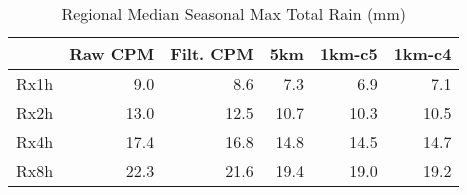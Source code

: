 \begin{table}
\caption{Regional Median Seasonal Max Total Rain (mm)}
\label{tab:max_rain}
\begin{tabular}{lrrrrr}
\toprule
 & Raw CPM & Filt. CPM & 5km & 1km-c5 & 1km-c4 \\
\midrule
Rx1h & 9.0 & 8.6 & 7.3 & 6.9 & 7.1 \\
Rx2h & 13.0 & 12.5 & 10.7 & 10.3 & 10.5 \\
Rx4h & 17.4 & 16.8 & 14.8 & 14.5 & 14.7 \\
Rx8h & 22.3 & 21.6 & 19.4 & 19.0 & 19.2 \\
\bottomrule
\end{tabular}
\end{table}
